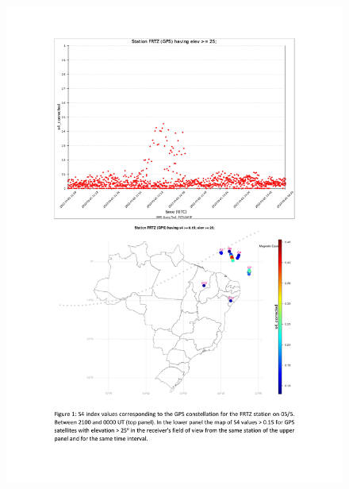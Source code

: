 \documentclass[a4paper, 10pt]{article}
\begin{document}
    \begin{figure}[H]
        \centering
        \includegraphics[width=14cm]{./figures/pt_outfileScint_0.jpg}
    \end{figure} 
 

    
\end{document}
